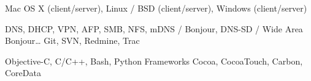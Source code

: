 
\cvcomputer
	{} {Mac OS X (client/server), Linux / BSD (client/server), Windows (client/server)}
	{} {}

\cvcomputer
	{} {DNS, DHCP, VPN, AFP, SMB, NFS, mDNS / Bonjour, DNS-SD / Wide Area Bonjour…}
	{} {Git, SVN, Redmine, Trac}

\cvcomputer
	{} {Objective-C, C/C++, Bash, Python}
	{Frameworks} {Cocoa, CocoaTouch, Carbon, CoreData}